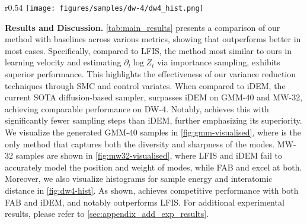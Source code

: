 \begin{wrapfigure}{r}{0.54\linewidth}
    \centering
    \vspace{-4mm}
    \texttt{[image: figures/samples/dw-4/dw4\_hist.png]}
    \vspace{-2mm}
    \caption{Histogram of interatomic distance and sample energy on DW-4.}
    \label{fig:dw4-hist}
    \vspace{-5mm}
\end{wrapfigure}
\textbf{Results and Discussion.} 
\cref{tab:main_results} presents a comparison of our method with baselines across various metrics, showing that \ours outperforms better in most cases. Specifically, compared to LFIS, the method most similar to ours in learning velocity and estimating $\partial_t \log Z_t$ via importance sampling, \ours exhibits superior performance. This highlights the effectiveness of our variance reduction techniques through SMC and control variates. 
When compared to iDEM, the current SOTA diffusion-based sampler, \ours surpasses iDEM on GMM-40 and MW-32, achieving comparable performance on DW-4. Notably, \ours achieves this with significantly fewer sampling steps than iDEM, further emphasizing its superiority.
We visualize the generated GMM-40 samples in \cref{fig:gmm-visualised}, where \ours is the only method that captures both the diversity and sharpness of the modes. 
MW-32 samples are shown in \cref{fig:mw32-visualised}, where LFIS and iDEM fail to accurately model the position and weight of modes, while FAB and \ours excel at both.
Moreover, we also visualize histograms for sample energy and interatomic distance in \cref{fig:dw4-hist}. As shown, \ours achieves competitive performance with both FAB and iDEM, and notably outperforms LFIS.
For additional experimental results, please refer to \cref{sec:appendix_add_exp_results}.
